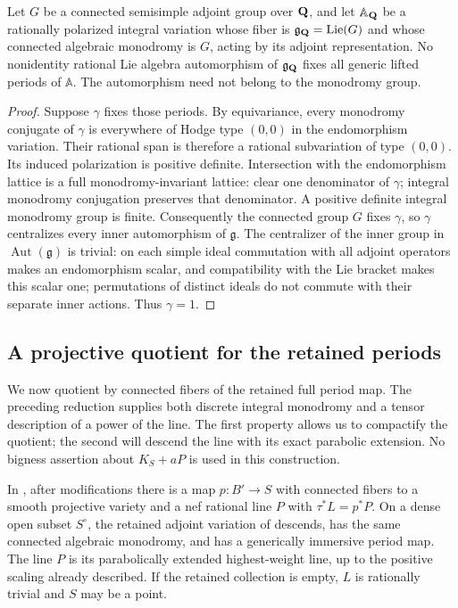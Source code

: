 \begin{lemma}
\label{period:stabilizer}
Let $G$ be a connected semisimple adjoint group over $\mathbf Q$, and let
$\mathbb A_{\mathbf Q}$ be a rationally polarized integral variation whose
fiber is $\mathfrak g_{\mathbf Q}=\operatorname{Lie}(G)$ and whose connected
algebraic monodromy is $G$, acting by its adjoint representation.
No nonidentity rational Lie algebra automorphism of
$\mathfrak g_{\mathbf Q}$ fixes all generic lifted periods of $\mathbb A$.
The automorphism need not belong to the monodromy group.
\end{lemma}

\begin{proof}
Suppose $\gamma$ fixes those periods.  By equivariance, every
monodromy conjugate of $\gamma$ is everywhere of Hodge type $(0,0)$
in the endomorphism variation.  Their rational span is therefore a
rational subvariation of type $(0,0)$.  Its induced polarization is
positive definite.  Intersection with the endomorphism lattice is
a full monodromy-invariant lattice: clear one denominator of
$\gamma$; integral monodromy conjugation preserves that denominator.
A positive definite integral monodromy group is finite.  Consequently
the connected group $G$ fixes $\gamma$, so $\gamma$ centralizes every
inner automorphism of $\mathfrak g$.  The centralizer of the inner
group in $\operatorname{Aut}(\mathfrak g)$ is trivial: on each simple
ideal commutation with all adjoint operators makes an endomorphism
scalar, and compatibility with the Lie bracket makes this scalar
one; permutations of distinct ideals do not commute with their
separate inner actions.  Thus $\gamma=1$.
\end{proof}

\subsection{A projective quotient for the retained periods}

We now quotient by connected fibers of the retained full period map.
The preceding reduction supplies both discrete integral monodromy
and a tensor description of a power of the line.  The first property
allows us to compactify the quotient; the second will descend the
line with its exact parabolic extension.  No bigness assertion about
$K_S+aP$ is used in this construction.

\begin{proposition}
\label{period:quotient}
In , after modifications there is a map
$p:B'\to S$ with connected fibers to a smooth projective variety
and a nef rational line $P$ with $\tau^*L=p^*P$.  On a dense open
subset $S^\circ$, the retained adjoint variation of
 descends, has the same connected
algebraic monodromy, and has a generically immersive period map.
The line $P$ is its parabolically extended highest-weight line,
up to the positive scaling already described.  If the retained
collection is empty, $L$ is rationally trivial and $S$ may be a
point.
\end{proposition}

